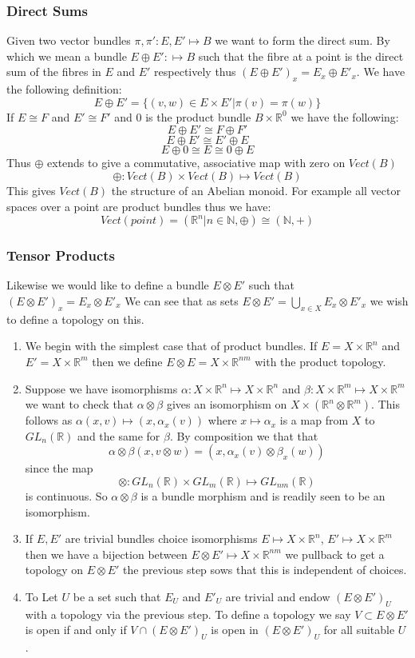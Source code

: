 \documentclass[a4paper,10pt]{article}
\theoremstyle{plain}%
\theoremstyle{definition}
\theoremstyle{remark}
\newcommand{\NN}{\mathbb{N}}
\newcommand{\RR}{\mathbb{R}}
\begin{document}
\subsubsection{Direct Sums}

Given two vector bundles $\pi,\pi':E,E'\mapsto B$ we want to form the direct sum. By which we mean a bundle 
$E\oplus E':\mapsto B$ such that the fibre at a point is the direct sum of the fibres in $E$
and $E'$ respectively thus $(E\oplus E')_x=E_x\oplus E'_x$. We have the following definition:
$$E\oplus E' = \{(v,w)\in E\times E' | \pi(v)=\pi(w) \}$$
If $E\cong F$ and $E'\cong F'$ and $0$ is the product bundle $B\times \RR^0$ we have the following:
$$ E\oplus E'\cong F\oplus F'$$
$$ E\oplus E'\cong E'\oplus E$$
$$ E\oplus 0\cong E \cong 0\oplus E$$
Thus $\oplus$ extends to give a commutative, associative map with zero on $Vect(B)$
$$\oplus :Vect(B)\times Vect(B)\mapsto Vect(B)$$
This gives $Vect(B)$ the structure of an Abelian monoid. For example all vector spaces over a point
are product bundles thus we have:
$$Vect(point)=({\RR^n|n\in\NN},\oplus)\cong (\NN,+)$$

\subsubsection{Tensor Products}

Likewise we would like to define a bundle $E\otimes E'$ such that $(E\otimes E')_x=E_x\otimes E'_x$
We can see that as sets $E\otimes E'=\bigcup_{x\in X}E_x\otimes E'_x$ we wish to define a topology on this.
\begin{enumerate}
 \item We begin with the simplest case that of product bundles. If $E=X\times \RR^n$ and $E'=X\times \RR^m$ 
then we define $E\otimes E = X\times \RR^{n m}$ with the product topology.
 \item Suppose we have isomorphisms $\alpha:X\times\RR^n\mapsto X\times\RR^n$ and 
$\beta:X\times\RR^m\mapsto X\times\RR^m$ we want to check that $\alpha\otimes\beta$ gives an
isomorphism on $X\times(\RR^n\otimes\RR^m)$. This follows as $\alpha(x,v)\mapsto(x,\alpha_x(v))$ where 
$x\mapsto\alpha_x$ is a map from $X$ to $GL_n(\RR)$ and the same for $\beta$. By composition we that that
$$\alpha\otimes\beta(x,v\otimes w)=(x,\alpha_x(v)\otimes\beta_x(w))$$
since the map
$$\otimes:GL_n(\RR)\times GL_m(\RR)\mapsto GL_{n m}(\RR)$$
is continuous. So $\alpha\otimes\beta$ is a bundle morphism and is readily seen to be an isomorphism. 
 \item If $E, E'$ are trivial bundles choice isomorphisms $E\mapsto X\times\RR^n$, $E'\mapsto X\times\RR^m$
then we have a bijection between $E\otimes E'\mapsto X\times\RR^{n m}$ we pullback to get a topology 
on $E\otimes E'$ the previous step sows that this is independent of choices.
 \item To Let $U$ be a set such that $E_U$ and $E'_U$ are trivial and endow $(E\otimes E')_U$ with a topology via the previous
step. To define a topology we say $V\subset E\otimes E'$ is open if and only if $V\cap (E\otimes E')_U$ is open in $(E\otimes E')_U$
for all suitable $U$.
\end{enumerate}
\end{document}
